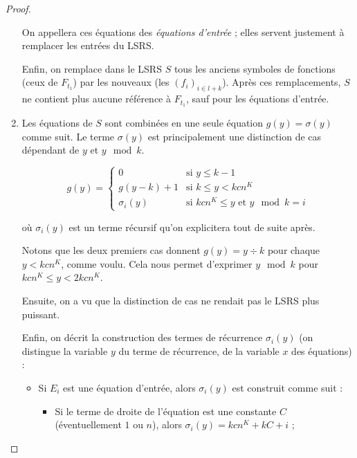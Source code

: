 \begin{appendices}
\begin{proof}
\begin{enumerate}[itemsep=-1mm,leftmargin=2cm]
				On appellera ces équations des \emph{équations d'entrée} ; elles servent justement à remplacer les entrées du LSRS.
				
				Enfin, on remplace dans le LSRS $S$ tous les anciens symboles de fonctions (ceux de $F_{t_1}$) par les nouveaux (les $(f_i)_{i \in l+k}$). Après ces remplacements, $S$ ne contient plus aucune référence à $F_{t_1}$, sauf pour les équations d'entrée. 
				
				\item 	
				Les équations de $S$ sont combinées en une seule équation $g(y) = \sigma(y)$ comme suit. Le terme $\sigma(y)$ est principalement une distinction de cas dépendant de $y$ et $y \mod{k}$. 
				
				\[
				g(y) = 
				\left\lbrace \begin{array}{ll}
				0 				& \text{si $y \leqslant k-1$} \\
				g(y-k) + 1 		& \text{si $k \leqslant y < kcn^K$} \\
				\sigma_i(y)		& \text{si $kcn^K \leqslant y$ et $y \mod{k} = i$}
				\end{array}\right.
				\]
				
				où $\sigma_i(y)$ est un terme récursif qu'on explicitera tout de suite après. 
				
				Notons que les deux premiers cas donnent $g(y) = y \div k$ pour chaque $y < kcn^K$, comme voulu. Cela nous permet d'exprimer $y \mod{k}$ pour $kcn^K \leqslant y < 2kcn^K$. %
				
				Ensuite, on a vu que la distinction de cas ne rendait pas le LSRS plus puissant. 
				
				Enfin, on décrit la construction des termes de récurrence $\sigma_i(y)$ (on distingue la variable $y$ du terme de récurrence, de la variable $x$ des équations) :
				
				
				
				
				
				\begin{itemize}[itemsep=-1mm, leftmargin=1cm]
					\item
					Si $E_i$ est une équation d'entrée, alors $\sigma_i(y)$ est construit comme suit :
					
					\begin{itemize}[itemsep=-1mm,leftmargin=1cm]
						\item %
						Si le terme de droite de l'équation est une constante $C$ (éventuellement $1$ ou $n$), alors $\sigma_i(y) = kcn^K + kC + i$ ;
						

\end{itemize}
\end{itemize}
\end{enumerate}
\end{proof}
\end{appendices}
